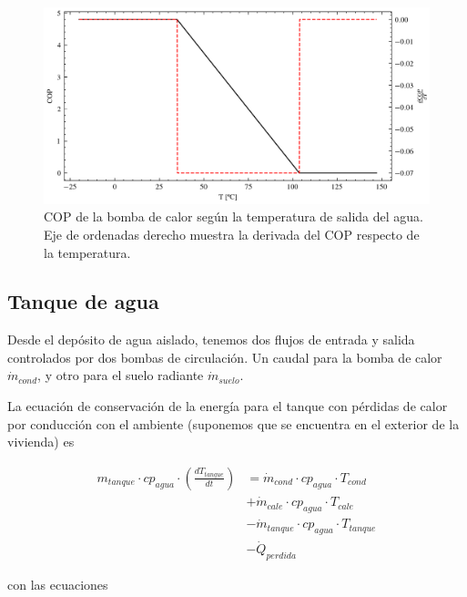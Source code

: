\begin{figure}[h] \centering
	\centering
	\includegraphics[width=1\textwidth]{./capitulos/resultados_discusion/images/heat_pump_cop.png}
	\caption{COP de la bomba de calor según la temperatura de salida del agua.
	Eje de ordenadas derecho muestra la derivada del COP respecto de la
	temperatura.}
	\label{fig:heat_pump_cop}
\end{figure}


\subsection{Tanque de agua}

Desde el depósito de agua aislado, tenemos dos flujos de entrada y salida
controlados por dos bombas de circulación. Un caudal para la bomba de calor
$\dot{m}_{cond}$, y otro para el suelo radiante $\dot{m}_{suelo}$.

La ecuación de conservación de la energía para el tanque con pérdidas de calor
por conducción con el ambiente (suponemos que se encuentra en el exterior de la
vivienda) es

\begin{align}
	m_{tanque} \cdot cp_{agua} \cdot \left( \frac{dT_{tanque}}{dt} \right) & = \dot{m}_{cond} \cdot cp_{agua} \cdot T_{cond} \nonumber     \\
	                                                                       & + \dot{m}_{cale} \cdot cp_{agua} \cdot T_{cale} \nonumber     \\
	                                                                       & - \dot{m}_{tanque} \cdot cp_{agua} \cdot T_{tanque} \nonumber \\
	                                                                       & - \dot{Q}_{perdida}
\end{align}

con las ecuaciones

